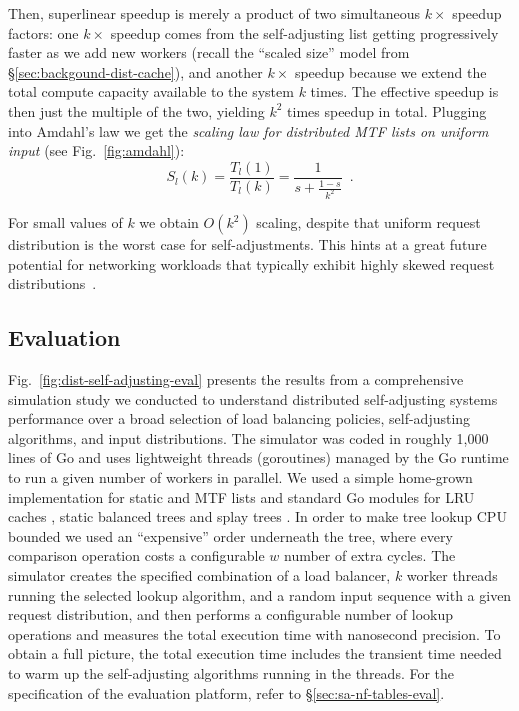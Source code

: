 Then, superlinear speedup is merely a product of two simultaneous $k\times$ speedup factors: one $k\times$ speedup comes from the self-adjusting list getting progressively faster as we add new workers (recall the ``scaled size'' model from \S\ref{sec:backgound-dist-cache}), and another $k\times$ speedup because we extend the total compute capacity available to the system $k$ times. The effective speedup is then just the multiple of the two, yielding $k^2$ times speedup in total. Plugging into Amdahl's law we get the \emph{scaling law for distributed MTF lists on uniform input} (see Fig.~\ref{fig:amdahl}):
\begin{equation}\label{eq:mtf-perf}
  S_l(k) = \frac{T_l(1)}{T_l(k)} = \frac1{s + \frac{1-s}{k^2}} \enspace .
\end{equation}

For small values of $k$ we obtain $O(k^2)$ scaling, despite that uniform request distribution is the worst case for self-adjustments. This hints at a great future potential for networking workloads that typically exhibit highly skewed request distributions~\cite{832484}.

\subsection{Evaluation}
\label{sec:sims}

Fig.~\ref{fig:dist-self-adjusting-eval} presents the results from a comprehensive simulation study we conducted to understand distributed self-adjusting systems performance over a broad selection of load balancing policies, self-adjusting algorithms, and input distributions. The simulator was coded in roughly 1,000 lines of Go and uses lightweight threads (goroutines) managed by the Go runtime to run a given number of workers in parallel. We used a simple home-grown implementation for static and MTF lists and standard Go modules for LRU caches \cite{golang-lru}, static balanced trees \cite{golang-btree} and splay trees \cite{golang-splay}. In order to make tree lookup CPU bounded we used an ``expensive'' order underneath the tree, where every comparison operation costs a configurable $w$ number of extra cycles. The simulator creates the specified combination of a load balancer, $k$ worker threads running the selected lookup algorithm, and a random input sequence with a given request distribution, and then performs a configurable number of lookup operations and measures the total execution time with nanosecond precision. To obtain a full picture, the total execution time includes the transient time needed to warm up the self-adjusting algorithms running in the threads. For the specification of the evaluation platform, refer to \S\ref{sec:sa-nf-tables-eval}.

